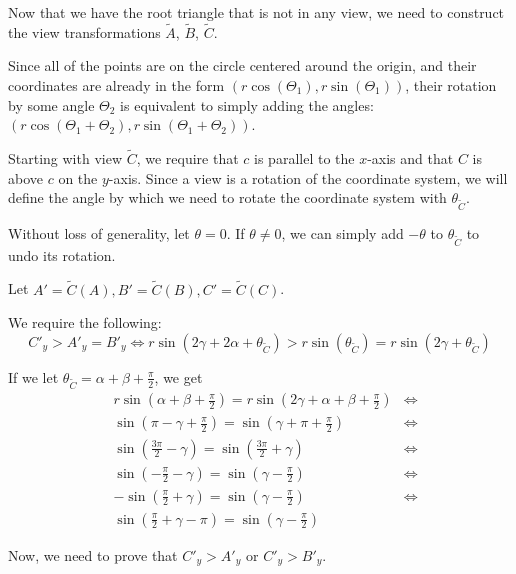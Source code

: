\documentclass[a4paper,12pt]{article}
\newcommand{\HSview}[1][V]{\widetilde{#1}}
\theoremstyle{definition}
\theoremstyle{plain}
\begin{document}
	Now that we have the root triangle that is not in any view, we need to construct the view transformations
	$\HSview[A]$, $\HSview[B]$, $\HSview[C]$.

	Since all of the points are on the circle centered around the origin, and their coordinates are already in the form
	$\left(r\cos\left(\Theta_1\right), r\sin\left(\Theta_1\right)\right)$, their rotation by some angle $\Theta_2$ is
	equivalent to simply adding the angles:
	$\left(r\cos\left(\Theta_1 + \Theta_2 \right), r\sin\left(\Theta_1 + \Theta_2\right)\right)$.

	Starting with view $\HSview[C]$, we require that $c$ is parallel to the $x$-axis and that $C$ is above $c$ on the
	$y$-axis. Since a view is a rotation of the coordinate system, we will define the angle by which we need to rotate
	the coordinate system with $\theta_{\HSview[C]}$.

	Without loss of generality, let $\theta = 0$. If $\theta \neq 0$, we can
	simply add $-\theta$ to $\theta_{\HSview[C]}$ to undo its rotation.

	Let $A' = \HSview[C]\left(A\right), B' = \HSview[C]\left(B\right), C' = \HSview[C]\left(C\right)$.

	We require the following:
	$$
		C'_y > A'_y = B'_y \iff
		r\sin\left(2\gamma + 2\alpha + \theta_{\HSview[C]}\right) >
		r\sin\left(\theta_{\HSview[C]}\right) =
		r\sin\left(2\gamma + \theta_{\HSview[C]}\right)
	$$

	If we let $\theta_{\HSview[C]} = \alpha + \beta + \frac{\pi}{2}$, we get
	\begin{align*}
		& r\sin\left(\alpha + \beta + \frac{\pi}{2}\right) = 
		  r\sin\left(2\gamma + \alpha + \beta + \frac{\pi}{2}\right) & \iff \\
		& \sin\left(\pi - \gamma + \frac{\pi}{2}\right) = 
		  \sin\left(\gamma + \pi + \frac{\pi}{2}\right) & \iff \\
		& \sin\left(\frac{3\pi}{2} - \gamma\right) = 
		  \sin\left(\frac{3\pi}{2} + \gamma\right) & \iff \\
		& \sin\left(-\frac{\pi}{2} - \gamma\right) = 
		  \sin\left(\gamma - \frac{\pi}{2}\right) & \iff \\
		& -\sin\left(\frac{\pi}{2} + \gamma\right) = 
		  \sin\left(\gamma - \frac{\pi}{2}\right) & \iff \\
		& \sin\left(\frac{\pi}{2} + \gamma - \pi\right) = 
		  \sin\left(\gamma - \frac{\pi}{2}\right)
	\end{align*}

	Now, we need to prove that $C'_y > A'_y$ or $C'_y > B'_y$.
\end{document}
